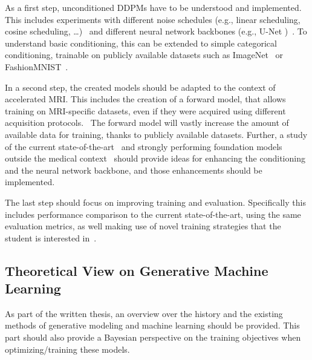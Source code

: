 \documentclass[a4paper]{article}
\begin{document}
As a first step, unconditioned DDPMs have to be understood and implemented. This includes experiments with different noise schedules (e.g., linear scheduling, cosine scheduling, \dots)~\cite{ho2020denoising,nichol2021improved} and different neural network backbones (e.g., U-Net )~\cite{ronneberger2015unet}. To understand basic conditioning, this can be extended to simple categorical conditioning, trainable on publicly available datasets such as ImageNet~\cite{5206848} or FashionMNIST~\cite{xiao2017fashionmnist}.

In a second step, the created models should be adapted to the context of accelerated MRI. This includes the creation of a forward model, that allows training on MRI-specific datasets, even if they were acquired using different acquisition protocols.~\cite{publicdatasetsCambridge} The forward model will vastly increase the amount of available data for training, thanks to publicly available datasets. Further, a study of the current state-of-the-art~\cite{10.1007/978-3-031-16446-0_62} and strongly performing foundation models outside the medical context~\cite{rombach2022highresolution} should provide ideas for enhancing the conditioning and the neural network backbone, and those enhancements should be implemented.

The last step should focus on improving training and evaluation. Specifically this includes performance comparison to the current state-of-the-art, using the same evaluation metrics, as well making use of novel training strategies that the student is interested in~\cite{loshchilov2017sgdr,micikevicius2018mixed}.

\subsection{Theoretical View on Generative Machine Learning}
As part of the written thesis, an overview over the history and the existing methods of generative modeling and machine learning should be provided. This part should also provide a Bayesian perspective on the training objectives when optimizing/training these models.
\end{document}
